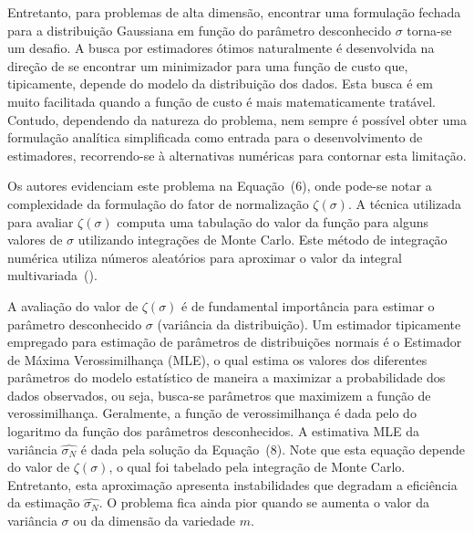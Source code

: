 \documentclass[a4paper,titlepage]{article}
\begin{document}
Entretanto, para problemas de alta dimensão, encontrar uma formulação fechada
para a distribuição Gaussiana em função do parâmetro desconhecido $\sigma$
torna-se um desafio. A busca por estimadores ótimos naturalmente é desenvolvida
na direção de se encontrar um minimizador para uma função de custo que,
tipicamente, depende do modelo da distribuição dos dados\cite{kay}. Esta busca
é em muito facilitada quando a função de custo é mais matematicamente tratável.
Contudo, dependendo da natureza do problema, nem sempre é possível obter uma
formulação analítica simplificada como entrada para o desenvolvimento de
estimadores, recorrendo-se à alternativas numéricas para contornar esta
limitação.

Os autores evidenciam este problema na Equação~(6), onde pode-se notar
a complexidade da formulação do fator de normalização $\zeta(\sigma)$. A
técnica utilizada para avaliar $\zeta(\sigma)$ computa uma tabulação do
valor da função para alguns valores de $\sigma$ utilizando integrações de Monte
Carlo.  Este método de integração numérica utiliza números aleatórios para
aproximar o valor da integral multivariada~(\cite{caflisch1998monte}).

A avaliação do valor de $\zeta(\sigma)$ é de fundamental importância para
estimar o parâmetro desconhecido $\sigma$ (variância da distribuição).
 Um estimador tipicamente empregado para estimação de parâmetros
de distribuições normais é o Estimador de Máxima Verossimilhança (MLE), o qual
estima os valores dos diferentes parâmetros do modelo estatístico de maneira a
maximizar a probabilidade dos dados observados, ou seja, busca-se parâmetros
que maximizem a função de verossimilhança. Geralmente, a função de
verossimilhança é dada pelo do logaritmo da função dos parâmetros
desconhecidos. A estimativa MLE da variância $\hat{\sigma_N}$ é dada pela
solução da Equação~(8). Note que esta equação depende do valor de
$\zeta(\sigma)$, o qual foi tabelado pela integração de Monte Carlo.
Entretanto, esta aproximação apresenta instabilidades que degradam a eficiência
da estimação $\hat{\sigma_N}$. O problema fica ainda pior quando se aumenta o
valor da variância $\sigma$ ou da dimensão da variedade $m$.  

\begin{center}
  \vspace{1em}
  \vspace{1em}
\end{center}
\end{document}
